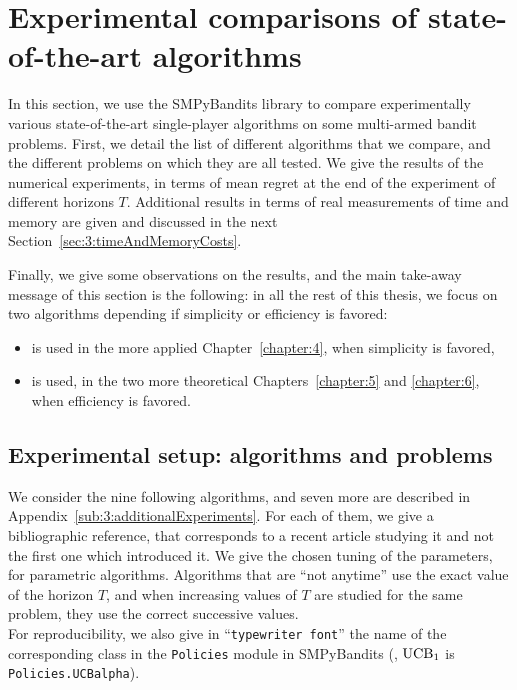 \section{Experimental comparisons of state-of-the-art algorithms}
\label{sec:3:reviewSPAlgorithms}


In this section, we use the SMPyBandits library to compare experimentally various state-of-the-art single-player algorithms on some multi-armed bandit problems.
First, we detail the list of different algorithms that we compare, and the different problems on which they are all tested.
We give the results of the numerical experiments, in terms of mean regret at the end of the experiment of different horizons $T$.
Additional results in terms of real measurements of time and memory are given and discussed in the next Section~\ref{sec:3:timeAndMemoryCosts}.

Finally, we give some observations on the results, and the main take-away message of this section is the following: in all the rest of this thesis, we focus on two algorithms depending if simplicity or efficiency is favored:
\begin{itemize}
    \item
    \UCB{} is used in the more applied Chapter~\ref{chapter:4}, when simplicity is favored,
    \item
    \klUCB{} is used, in the two more theoretical Chapters~\ref{chapter:5} and \ref{chapter:6}, when efficiency is favored.
\end{itemize}


\subsection{Experimental setup: algorithms and problems}


We consider the nine following algorithms, and seven more are described in Appendix~\ref{sub:3:additionalExperiments}.
For each of them, we give a bibliographic reference, that corresponds to a recent article studying it and not the first one which introduced it.
We give the chosen tuning of the parameters, for parametric algorithms.
Algorithms that are ``not anytime'' use the exact value of the horizon $T$, and when increasing values of $T$ are studied for the same problem, they use the correct successive values. \\
%
\indent
For reproducibility, we also give in ``\texttt{typewriter font}'' the name of the corresponding class in the \texttt{Policies} module in SMPyBandits
(\eg, $\mathrm{UCB}_1$ is \texttt{Policies.UCBalpha}).

